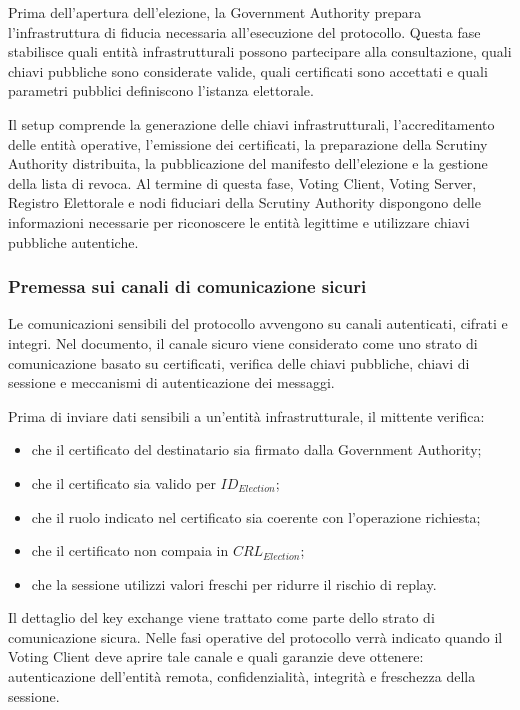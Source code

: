 \documentclass[a4paper,12pt]{article}
\begin{document}
Prima dell'apertura dell'elezione, la Government Authority prepara l'infrastruttura di fiducia necessaria all'esecuzione del protocollo. 
Questa fase stabilisce quali entit\`a infrastrutturali possono partecipare alla consultazione, quali chiavi pubbliche sono considerate valide, quali certificati sono accettati e quali parametri pubblici definiscono l'istanza elettorale.

Il setup comprende la generazione delle chiavi infrastrutturali, l'accreditamento delle entit\`a operative, l'emissione dei certificati, la preparazione della Scrutiny Authority distribuita, la pubblicazione del manifesto dell'elezione e la gestione della lista di revoca. 
Al termine di questa fase, Voting Client, Voting Server, Registro Elettorale e nodi fiduciari della Scrutiny Authority dispongono delle informazioni necessarie per riconoscere le entit\`a legittime e utilizzare chiavi pubbliche autentiche.

\subsubsection{Premessa sui canali di comunicazione sicuri}

Le comunicazioni sensibili del protocollo avvengono su canali autenticati, cifrati e integri. 
Nel documento, il canale sicuro viene considerato come uno strato di comunicazione basato su certificati, verifica delle chiavi pubbliche, chiavi di sessione e meccanismi di autenticazione dei messaggi.

Prima di inviare dati sensibili a un'entit\`a infrastrutturale, il mittente verifica:

\begin{itemize}
	\item che il certificato del destinatario sia firmato dalla Government Authority;
	\item che il certificato sia valido per \(ID_{Election}\);
	\item che il ruolo indicato nel certificato sia coerente con l'operazione richiesta;
	\item che il certificato non compaia in \(CRL_{Election}\);
	\item che la sessione utilizzi valori freschi per ridurre il rischio di replay.
\end{itemize}

Il dettaglio del key exchange viene trattato come parte dello strato di comunicazione sicura. 
Nelle fasi operative del protocollo verr\`a indicato quando il Voting Client deve aprire tale canale e quali garanzie deve ottenere: autenticazione dell'entit\`a remota, confidenzialit\`a, integrit\`a e freschezza della sessione.
\end{document}
